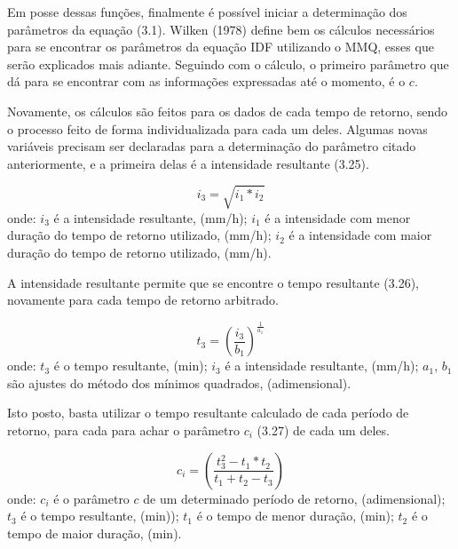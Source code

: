 \bigskip

Em posse dessas funções, finalmente é possível iniciar a determinação dos parâmetros da equação (3.1). Wilken (1978) define bem os cálculos necessários para se encontrar os parâmetros da equação IDF utilizando o MMQ, esses que serão explicados mais adiante. Seguindo com o cálculo, o primeiro parâmetro que dá para se encontrar com as informações expressadas até o momento, é o $c$. 

Novamente, os cálculos são feitos para os dados de cada tempo de retorno, sendo o processo feito de forma individualizada para cada um deles. Algumas novas variáveis precisam ser declaradas para a determinação do parâmetro citado anteriormente, e a primeira delas é a intensidade resultante (3.25).\bigskip

\begin{equation}
i_3 = \sqrt{i_1 * i_2}
\end{equation}
\newline
onde:
\newline
\textit{$i_3$} é a intensidade resultante, (mm/h);
\newline
\textit{$i_1$} é a intensidade com menor duração do tempo de retorno utilizado, (mm/h);
\newline
\textit{$i_2$} é a intensidade com maior duração do tempo de retorno utilizado, (mm/h).\bigskip

A intensidade resultante permite que se encontre o tempo resultante (3.26), novamente para cada tempo de retorno arbitrado.\bigskip

\begin{equation}
t_3 = {\left(\frac{i_3}{b_1}\right)}^{\frac{1}{a_1}}
\end{equation}
\newline
\newline
onde:
\newline
$t_3$ é o tempo resultante, (min);
\newline
$i_3$ é a intensidade resultante, (mm/h);
\newline
$a_1$, $b_1$ são ajustes do método dos mínimos quadrados, (adimensional).\bigskip

Isto posto, basta utilizar o tempo resultante calculado de cada período de retorno, para cada para achar o parâmetro $c_i$ (3.27) de cada um deles.\bigskip

\begin{equation}
c_i = \left(\frac{t_3^2 - t_1 * t_2}{t_1 + t_2 - t_3}\right)
\end{equation}
\newline
onde:
\newline
\textit{$c_i$} é o parâmetro $c$ de um determinado período de retorno, (adimensional);
\newline
\textit{$t_3$} é o tempo resultante, (min));
\newline
\textit{$t_1$} é o tempo de menor duração, (min);
\newline
\textit{$t_2$} é o tempo de maior duração, (min).\bigskip

